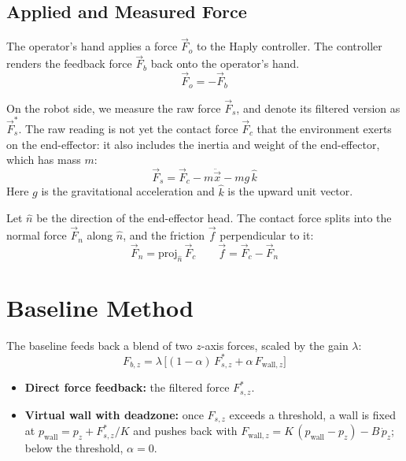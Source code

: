 \documentclass[11pt]{article}
\begin{document}
\subsection{Applied and Measured Force}

The operator's hand applies a force $\vec{F}_o$ to the Haply controller.
The controller renders the feedback force $\vec{F}_b$ back onto the operator's hand.
\begin{equation*}
\vec{F}_o = - \vec{F}_b
\end{equation*}

On the robot side, we measure the raw force $\vec{F}_s$, and denote its filtered version as $\vec{F}_s^\ast$.
The raw reading is not yet the contact force $\vec{F}_c$ that the environment exerts on the end-effector: it also includes the inertia and weight of the end-effector, which has mass $m$:
\begin{equation*}
\vec{F}_s = \vec{F}_c - m\ddot{\vec{x}} - mg\,\hat{k}
\end{equation*}
Here $g$ is the gravitational acceleration and $\hat{k}$ is the upward unit vector.

Let $\hat{n}$ be the direction of the end-effector head.
The contact force splits into the normal force $\vec{F}_n$ along $\hat{n}$, and the friction $\vec{f}$ perpendicular to it:
\begin{equation*}
\vec{F}_n = \text{proj}_{\hat{n}}\,\vec{F}_c \quad\quad \vec{f} = \vec{F}_c - \vec{F}_n
\end{equation*}

\section{Baseline Method}

The baseline feeds back a blend of two $z$-axis forces, scaled by the gain $\lambda$:
\begin{equation*}
F_{b,z} = \lambda\,\big[(1-\alpha)\,F^\ast_{s,z} + \alpha\,F_{\text{wall},z}\big]
\end{equation*}
\begin{itemize}
    \item \textbf{Direct force feedback:} the filtered force $F^\ast_{s,z}$.
    \item \textbf{Virtual wall with deadzone:} once $F_{s,z}$ exceeds a threshold, a wall is fixed at $p_\text{wall} = p_z + F^\ast_{s,z}/K$ and pushes back with $F_{\text{wall},z} = K\,(p_\text{wall} - p_z) - B\,\dot{p}_z$; below the threshold, $\alpha = 0$.
\end{itemize}
\end{document}
